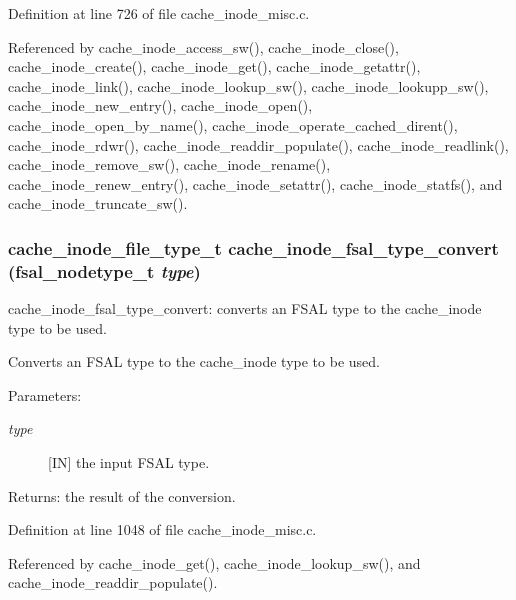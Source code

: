 Definition at line 726 of file cache\_\-inode\_\-misc.c.

Referenced by cache\_\-inode\_\-access\_\-sw(), cache\_\-inode\_\-close(), cache\_\-inode\_\-create(), cache\_\-inode\_\-get(), cache\_\-inode\_\-getattr(), cache\_\-inode\_\-link(), cache\_\-inode\_\-lookup\_\-sw(), cache\_\-inode\_\-lookupp\_\-sw(), cache\_\-inode\_\-new\_\-entry(), cache\_\-inode\_\-open(), cache\_\-inode\_\-open\_\-by\_\-name(), cache\_\-inode\_\-operate\_\-cached\_\-dirent(), cache\_\-inode\_\-rdwr(), cache\_\-inode\_\-readdir\_\-populate(), cache\_\-inode\_\-readlink(), cache\_\-inode\_\-remove\_\-sw(), cache\_\-inode\_\-rename(), cache\_\-inode\_\-renew\_\-entry(), cache\_\-inode\_\-setattr(), cache\_\-inode\_\-statfs(), and cache\_\-inode\_\-truncate\_\-sw().
\subsubsection{\setlength{\rightskip}{0pt plus 5cm}cache\_\-inode\_\-file\_\-type\_\-t cache\_\-inode\_\-fsal\_\-type\_\-convert (fsal\_\-nodetype\_\-t {\em type})}\label{cache__inode__misc_8c_a9}


cache\_\-inode\_\-fsal\_\-type\_\-convert: converts an FSAL type to the cache\_\-inode type to be used.

Converts an FSAL type to the cache\_\-inode type to be used.

\begin{Desc}
\item[Parameters:]
\begin{description}
\item[{\em type}][IN] the input FSAL type.\end{description}
\end{Desc}
\begin{Desc}
\item[Returns:]the result of the conversion. \end{Desc}


Definition at line 1048 of file cache\_\-inode\_\-misc.c.

Referenced by cache\_\-inode\_\-get(), cache\_\-inode\_\-lookup\_\-sw(), and cache\_\-inode\_\-readdir\_\-populate().
